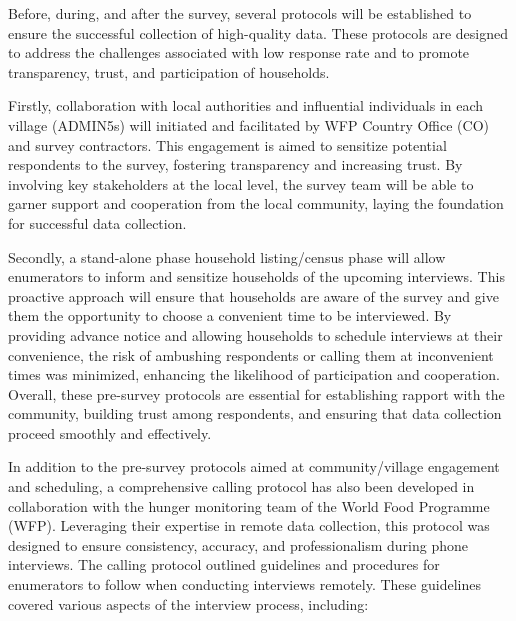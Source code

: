 \documentclass[11pt,harvard]{article}
\begin{document}
Before, during, and after the survey, several protocols will be established to ensure the successful collection of high-quality data. These protocols are designed to address the challenges associated with low response rate and to promote transparency, trust, and participation of households.

Firstly, collaboration with local authorities and influential individuals in each village (ADMIN5s) will initiated and facilitated by WFP Country Office (CO) and survey contractors. This engagement is aimed to sensitize potential respondents to the survey, fostering transparency and increasing trust. By involving key stakeholders at the local level, the survey team will be able to garner support and cooperation from the local community, laying the foundation for successful data collection.

Secondly, a stand-alone phase household listing/census phase will allow enumerators to inform and sensitize households of the upcoming interviews. This proactive approach will ensure that households are aware of the survey and give them the opportunity to choose a convenient time to be interviewed. By providing advance notice and allowing households to schedule interviews at their convenience, the risk of ambushing respondents or calling them at inconvenient times was minimized, enhancing the likelihood of participation and cooperation. Overall, these pre-survey protocols are essential for establishing rapport with the community, building trust among respondents, and ensuring that data collection proceed smoothly and effectively. 

In addition to the pre-survey protocols aimed at community/village engagement and scheduling, a comprehensive calling protocol has also been developed in collaboration with the hunger monitoring team of the World Food Programme (WFP). Leveraging their expertise in remote data collection, this protocol was designed to ensure consistency, accuracy, and professionalism during phone interviews. The calling protocol outlined guidelines and procedures for enumerators to follow when conducting interviews remotely. These guidelines covered various aspects of the interview process, including:
\end{document}
